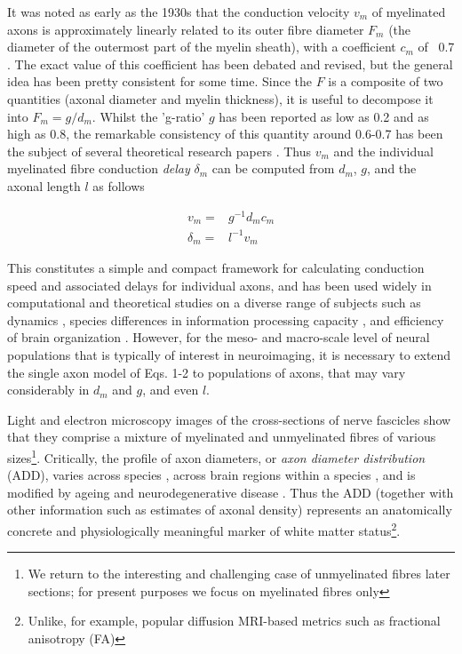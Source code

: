 It was noted as early as the 1930s that the conduction velocity $v_m$ of myelinated axons is approximately linearly related to its outer fibre diameter $F_m$ (the diameter of the outermost part of the myelin sheath), with a coefficient $c_m$ of ~0.7  \cite{hursh1939the,rushton1951a,waxman1972relative}. The exact value of this coefficient has been debated and revised, but the general idea has been pretty consistent for some time. Since the $F$ is a composite of two quantities (axonal diameter and myelin thickness), it is useful to decompose it into $F_m = g/d_m$. Whilst the 'g-ratio' $g$ has been reported as low as 0.2 and as high as 0.8, the remarkable consistency of this quantity around 0.6-0.7 has been the subject of several theoretical research papers 
\cite{rushton1951a,chomiak2009what,paus2009could,caminiti2009evolution,ritchie1982on}. Thus $v_m$ and the individual myelinated fibre conduction \textit{delay} $\delta_m$ can be computed from $d_m$, $g$, and the axonal length $l$ as follows

\begin{eqnarray}
v_m      =& g^{-1} d_m c_m \\
\delta_m =& l^{-1} v_m
\end{eqnarray}




This constitutes a simple and compact framework for calculating conduction speed and associated delays for individual axons, and has been used widely in computational and theoretical studies on a diverse range of subjects such as dynamics , species differences in information processing capacity \cite{caminiti2009evolution}, and efficiency of brain organization . However, for the meso- and macro-scale level of neural populations that is typically of interest in neuroimaging, it is necessary to extend the single axon model of Eqs. 1-2 to  populations of axons, that may vary considerably in $d_m$ and $g$, and even $l$. 

Light and electron microscopy images of the cross-sections of nerve fascicles show that they comprise a mixture of myelinated and unmyelinated fibres of various sizes\footnote{We return to the interesting and challenging case of unmyelinated fibres later sections; for present purposes we focus on myelinated fibres only}. Critically, the profile of axon diameters, or \textit{axon diameter distribution} (ADD), varies across species \cite{caminiti2013diameter}, across brain regions within a species \cite{aboitiz1992fiber,innocenti2010fiber}, and is modified by ageing and neurodegenerative disease . Thus the ADD (together with other information such as estimates of axonal density) represents an anatomically concrete and physiologically meaningful marker of white matter status\footnote{Unlike, for example, popular diffusion MRI-based metrics such as fractional anisotropy (FA)}. 

